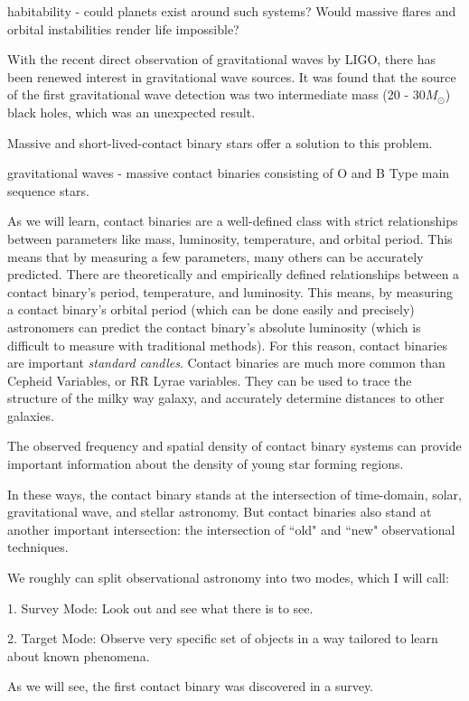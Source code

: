 \documentclass[12pt]{article} %
\numberwithin{equation}{section} %
\begin{document}
habitability - could planets exist around such systems? Would massive flares and orbital instabilities render life impossible?

With the recent direct observation of gravitational waves by LIGO, there has been renewed interest in gravitational wave sources. It was found that the source of the first gravitational wave detection was two intermediate mass (20 - 30$M_{\odot}$) black holes, which was an unexpected result. 

Massive and short-lived-contact binary stars offer a solution to this problem. 

gravitational waves - massive contact binaries consisting of O and B Type main sequence stars.

As we will learn, contact binaries are a well-defined class with strict relationships between parameters like mass, luminosity, temperature, and orbital period. This means that by measuring a few parameters, many others can be accurately predicted. There are theoretically and empirically defined relationships between a contact binary's period, temperature, and luminosity. This means, by measuring a contact binary's orbital period (which can be done easily and precisely) astronomers can predict the contact binary's absolute luminosity (which is difficult to measure with traditional methods). For this reason, contact binaries are important \emph{standard candles}. Contact binaries are much more common than Cepheid Variables, or RR Lyrae variables. They can be used to trace the structure of the milky way galaxy, and accurately determine distances to other galaxies.

The observed frequency and spatial density of contact binary systems can provide important information about the density of young star forming regions.

In these ways, the contact binary stands at the intersection of time-domain, solar, gravitational wave, and stellar astronomy. But contact binaries also stand at another important intersection: the intersection of ``old" and ``new" observational techniques. 

We roughly can split observational astronomy into two modes, which I will call:

1. Survey Mode: Look out and see what there is to see.

2. Target Mode: Observe very specific set of objects in a way tailored to learn about known phenomena.

As we will see, the first contact binary was discovered in a survey. 
\end{document}
